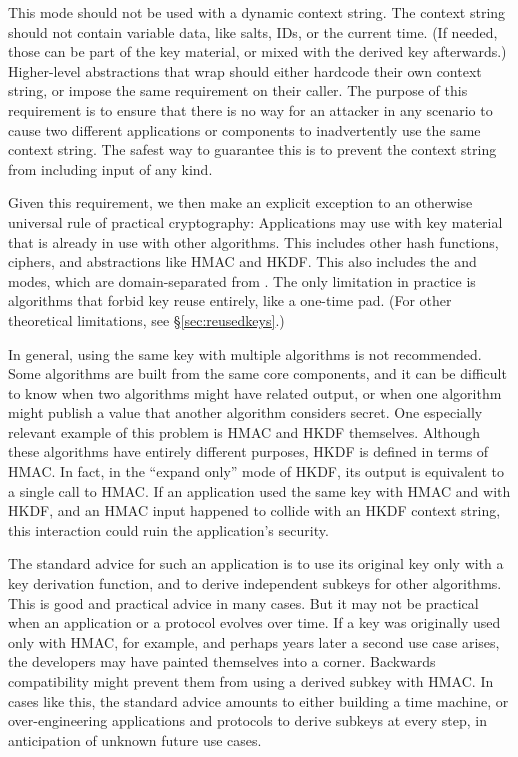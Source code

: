 \documentclass[11pt,notitlepage,a4paper]{article}
\newcommand{\flag}[1]{\texttt{\detokenize{#1}}\xspace}
\begin{document}
This mode should not be used with a dynamic context string. The context string
should not contain variable data, like salts, IDs, or the current time. (If
needed, those can be part of the key material, or mixed with the derived key
afterwards.) Higher-level abstractions that wrap \flag{derive_key} should
either hardcode their own context string, or impose the same requirement on
their caller. The purpose of this requirement is to ensure that there is no way
for an attacker in any scenario to cause two different applications or
components to inadvertently use the same context string. The safest way to
guarantee this is to prevent the context string from including input of any
kind.

Given this requirement, we then make an explicit exception to an otherwise
universal rule of practical cryptography: Applications may use
\flag{derive_key} with key material that is already in use with other
algorithms. This includes other hash functions, ciphers, and abstractions like
HMAC and HKDF. This also includes the \flag{hash} and \flag{keyed_hash} modes,
which are domain-separated from \flag{derive_key}. The only limitation in
practice is algorithms that forbid key reuse entirely, like a one-time pad.
(For other theoretical limitations, see \S\ref{sec:reusedkeys}.)

In general, using the same key with multiple algorithms is not recommended.
Some algorithms are built from the same core components, and it can be
difficult to know when two algorithms might have related output, or when one
algorithm might publish a value that another algorithm considers secret. One
especially relevant example of this problem is HMAC and HKDF themselves.
Although these algorithms have entirely different purposes, HKDF is defined in
terms of HMAC. In fact, in the ``expand only'' mode of HKDF, its output is
equivalent to a single call to HMAC. If an application used the same key with
HMAC and with HKDF, and an HMAC input happened to collide with an HKDF context
string, this interaction could ruin the application's security.

The standard advice for such an application is to use its original key only
with a key derivation function, and to derive independent subkeys for other
algorithms. This is good and practical advice in many cases. But it may not be
practical when an application or a protocol evolves over time. If a key was
originally used only with HMAC, for example, and perhaps years later a second
use case arises, the developers may have painted themselves into a corner.
Backwards compatibility might prevent them from using a derived subkey with
HMAC. In cases like this, the standard advice amounts to either building a time
machine, or over-engineering applications and protocols to derive subkeys at
every step, in anticipation of unknown future use cases.
\end{document}

